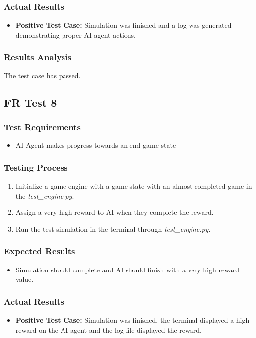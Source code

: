 \documentclass[12pt, titlepage]{article}
\providecommand{\DIFaddbegin}{} %
\providecommand{\DIFaddend}{} %
\begin{document}
\subsubsection{Actual Results}
\begin{itemize}
    \item \textbf{Positive Test Case:} Simulation was finished and a log was generated demonstrating proper AI agent actions.
\end{itemize}
\subsubsection{Results Analysis}
The test case has passed.

\subsection{FR Test 8}\DIFaddbegin \label{FRT8} 
\DIFaddend \subsubsection{Test Requirements}
\begin{itemize}
    \item AI Agent makes progress towards an end-game state
\end{itemize}
\subsubsection{Testing Process}
\begin{enumerate}
    \item Initialize a game engine with a game state with an almost completed game in the \textit{test\_engine.py}. 
    \item Assign a very high reward to AI when they complete the reward.
    \item Run the test simulation in the terminal through \textit{test\_engine.py}.
\end{enumerate}
\subsubsection{Expected Results}
\begin{itemize}
    \item Simulation should complete and AI should finish with a very high reward value.
\end{itemize}
\subsubsection{Actual Results}
\begin{itemize}
    \item \textbf{Positive Test Case:} Simulation was finished, the terminal displayed a high reward on the AI agent and the log file displayed the reward.
\end{itemize}
\end{document}
